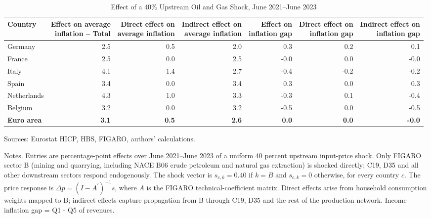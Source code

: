 \begin{table}[H]
\centering
\caption{Effect of a 40\% Upstream Oil and Gas Shock, June 2021--June 2023}
\scriptsize
\setlength{\tabcolsep}{4.2pt}
\begin{tabular}{lrrrrrr}
\toprule
Country & \shortstack{Effect on average\\inflation -- Total} & \shortstack{Direct effect on\\average inflation} & \shortstack{Indirect effect on\\average inflation} & \shortstack{Effect on\\inflation gap} & \shortstack{Direct effect on\\inflation gap} & \shortstack{Indirect effect on\\inflation gap}
 \\
\midrule
Germany & 2.5 & 0.5 & 2.0 & 0.3 & 0.2 & 0.1
 \\
France & 2.5 & 0.0 & 2.5 & -0.0 & 0.0 & -0.0
 \\
Italy & 4.1 & 1.4 & 2.7 & -0.4 & -0.2 & -0.2
 \\
Spain & 3.4 & 0.0 & 3.4 & 0.3 & 0.0 & 0.3
 \\
Netherlands & 4.3 & 1.0 & 3.3 & -0.3 & 0.1 & -0.4
 \\
Belgium & 3.2 & 0.0 & 3.2 & -0.5 & 0.0 & -0.5
 \\
\midrule
\textbf{Euro area} & \textbf{3.1} & \textbf{0.5} & \textbf{2.6} & \textbf{0.0} & \textbf{0.0} & \textbf{-0.0}
 \\
\bottomrule
\end{tabular}
\par\vspace{0.35em}\footnotesize\noindent Sources: Eurostat HICP, HBS, FIGARO, authors' calculations.
\par\vspace{0.25em}\footnotesize\noindent Notes. Entries are percentage-point effects over June 2021--June 2023 of a uniform 40 percent upstream input-price shock. Only FIGARO sector B (mining and quarrying, including NACE B06 crude petroleum and natural gas extraction) is shocked directly; C19, D35 and all other downstream sectors respond endogenously. The shock vector is $s_{c,k}=0.40$ if $k=B$ and $s_{c,k}=0$ otherwise, for every country $c$. The price response is $\Delta p = (I - A^{\prime})^{-1}s$, where $A$ is the FIGARO technical-coefficient matrix. Direct effects arise from household consumption weights mapped to B; indirect effects capture propagation from B through C19, D35 and the rest of the production network. Income inflation gap = Q1 - Q5 of revenues.
\end{table}
\vspace{0.6em}
